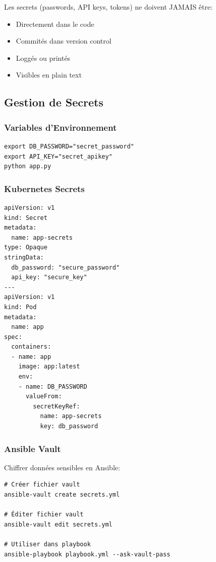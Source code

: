 \documentclass[12pt,a4paper]{report}
\begin{document}
Les secrets (passwords, API keys, tokens) ne doivent JAMAIS être:
\begin{itemize}
    \item Directement dans le code
    \item Commités dans version control
    \item Loggés ou printés
    \item Visibles en plain text
\end{itemize}

\subsection{Gestion de Secrets}

\subsubsection{Variables d'Environnement}

\lstset{language=bash}
\begin{lstlisting}
export DB_PASSWORD="secret_password"
export API_KEY="secret_apikey"
python app.py
\end{lstlisting}

\subsubsection{Kubernetes Secrets}

\lstset{language=yaml}
\begin{lstlisting}
apiVersion: v1
kind: Secret
metadata:
  name: app-secrets
type: Opaque
stringData:
  db_password: "secure_password"
  api_key: "secure_key"
---
apiVersion: v1
kind: Pod
metadata:
  name: app
spec:
  containers:
  - name: app
    image: app:latest
    env:
    - name: DB_PASSWORD
      valueFrom:
        secretKeyRef:
          name: app-secrets
          key: db_password
\end{lstlisting}

\subsubsection{Ansible Vault}

Chiffrer données sensibles en Ansible:

\lstset{language=bash}
\begin{lstlisting}
# Créer fichier vault
ansible-vault create secrets.yml

# Éditer fichier vault
ansible-vault edit secrets.yml

# Utiliser dans playbook
ansible-playbook playbook.yml --ask-vault-pass
\end{lstlisting}
\end{document}
